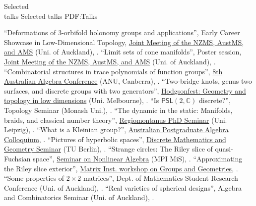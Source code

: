\documentclass[a4paper,yyyy,nonstopmode,10pt]{simpleresumecv}
\begin{document}
\begin{Body}
%
%
\endgroup



\Section
{Selected\\talks}
{Selected talks}
{PDF:Talks}


\begingroup
\renewcommand{\MaxNumberedItem}{[88]}

\BigGap
\NumberedItem{[12]}
``Deformations of 3-orbifold holonomy groups and applications'', Early Career Showcase in Low-Dimensional Topology, \href{https://ms-meet-2024.blogs.auckland.ac.nz/}{Joint Meeting of the NZMS, AustMS, and AMS} (Uni. of Auckland),
.
\Gap
\NumberedItem{[11]}
``Limit sets of cone manifolds'', Poster session, \href{https://ms-meet-2024.blogs.auckland.ac.nz/}{Joint Meeting of the NZMS, AustMS, and AMS} (Uni. of Auckland),
.
\Gap
\NumberedItem{[10]}
``Combinatorial structures in trace polynomials of function groups'', \href{https://maths.anu.edu.au/news-events/events/8th-australian-algebra-conference}{8th Australian Algebra Conference} (ANU, Canberra),
.
\Gap
\NumberedItem{[9]}
``Two-bridge knots, genus two surfaces, and discrete groups with two generators'', \href{https://sites.google.com/view/agtw/hodgsonfest}{Hodgsonfest: Geometry and topology in low dimensions} (Uni. Melbourne),
.
\Gap
\NumberedItem{[8]}
``Is $ \mathsf{PSL}(2,\mathbb{C}) $ discrete?'', Topology Seminar (Monash Uni.),
.
\Gap
\NumberedItem{[7]}
``The dynamic in the static: Manifolds, braids, and classical number theory'', \href{https://sites.google.com/view/regiomontanus-phd/}{Regiomontanus PhD Seminar} (Uni. Leipzig),
.
\Gap
\NumberedItem{[6]}
``What is a Kleinian group?'', \href{https://www.apacmath.org}{Australian Postgraduate Algebra Colloquium},
.
\Gap
\NumberedItem{[5]}
``Pictures of hyperbolic spaces'', \href{https://www.mi.fu-berlin.de/en/math/groups/discgeom/index.html}{Discrete Mathematics and Geometry Seminar} (TU Berlin),
.
\Gap
\NumberedItem{[4]}
``Strange circles: The Riley slice of quasi-Fuchsian space'', \href{https://www.mis.mpg.de/events/series/seminar-on-nonlinear-algebra}{Seminar on Nonlinear Algebra} (MPI MiS),
.
\Gap
\NumberedItem{[3]}
``Approximating the Riley slice exterior'', \href{https://www.matrix-inst.org.au/events/groups-and-geometries/}{Matrix Inst. workshop on Groups and Geometries},
.
\Gap
\NumberedItem{[2]}
``Some properties of $2 \times 2 $ matrices'', Dept. of Mathematics Student Research Conference (Uni. of Auckland),
.
\Gap
\NumberedItem{[1]}
``Real varieties of spherical designs'', Algebra and Combinatorics Seminar (Uni. of Auckland),
.


\end{Body}
\end{document}
